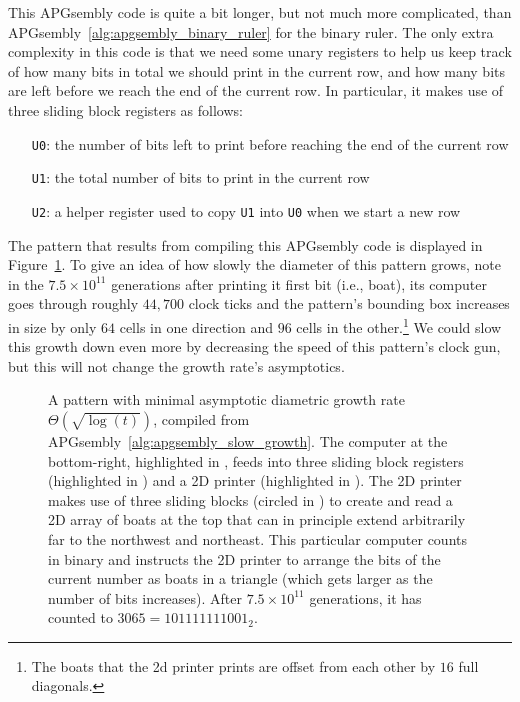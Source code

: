 This APGsembly code is quite a bit longer, but not much more complicated, than APGsembly~\ref{alg:apgsembly_binary_ruler} for the binary ruler. The only extra complexity in this code is that we need some unary registers to help us keep track of how many bits in total we should print in the current row, and how many bits are left before we reach the end of the current row. In particular, it makes use of three sliding block registers as follows:\smallskip

\begin{itemize}
	\item[\texttt{U0}:] the number of bits left to print before reaching the end of the current row
	
	\item[\texttt{U1}:] the total number of bits to print in the current row
	
	\item[\texttt{U2}:] a helper register used to copy \texttt{U1} into \texttt{U0} when we start a new row\smallskip
\end{itemize}

The pattern that results from compiling this APGsembly code is displayed in Figure~\ref{fig:osqrtlogt}. To give an idea of how slowly the diameter of this pattern grows, note in the $7.5 \times 10^{11}$ generations after printing it first bit (i.e., boat), its computer goes through roughly $44,700$ clock ticks and the pattern's bounding box increases in size by only $64$ cells in one direction and $96$ cells in the other.\footnote{The boats that the 2d printer prints are offset from each other by $16$ full diagonals.} We could slow this growth down even more by decreasing the speed of this pattern's clock gun, but this will not change the growth rate's asymptotics.

\begin{figure}[!htb]
	\centering
	\caption{A pattern with minimal asymptotic diametric growth rate $\Theta(\sqrt{\log(t)})$, compiled from APGsembly~\ref{alg:apgsembly_slow_growth}. The computer at the bottom-right, highlighted in , feeds into three sliding block registers (highlighted in ) and a 2D printer (highlighted in ). The 2D printer makes use of three sliding blocks (circled in ) to create and read a 2D array of boats at the top that can in principle extend arbitrarily far to the northwest and northeast. This particular computer counts in binary and instructs the 2D printer to arrange the bits of the current number as boats in a triangle (which gets larger as the number of bits increases). After $7.5 \times 10^{11}$ generations, it has counted to $3065 = 101111111001_2$.}\label{fig:osqrtlogt}
\end{figure}

